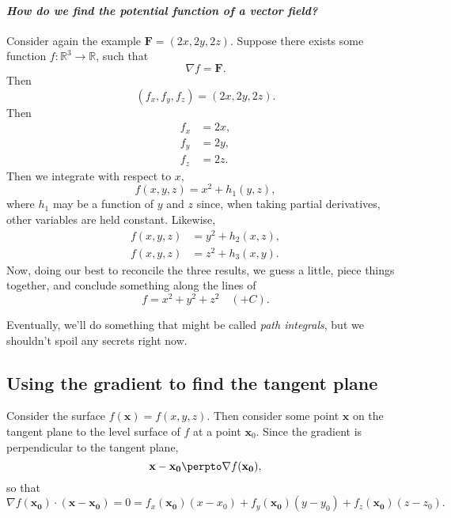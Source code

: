 \documentclass[11pt]{article}
\renewcommand{\vec}[1]{\mathbf{#1}}
\begin{document}
\paragraph{\emph{How do we find the potential function of a vector field?}}

Consider again the example \(\vec F = (2x, 2y, 2z)\). Suppose there exists some function \(f \colon \mathbb R^3 \to \mathbb R\), such that
\[
    \nabla f = \vec F.
\]
Then 
\[
    (f_x, f_y, f_z) = (2x, 2y, 2z).
\]
Then
\begin{align*}
    f_x &= 2x, \\
    f_y &= 2y, \\
    f_z &= 2z.
\end{align*}
Then we integrate with respect to \(x\),
\[
    f(x, y, z) = x^2 + h_1(y, z),
\]
where \(h_1\) may be a function of \(y\) and \(z\) since, when taking partial derivatives, other variables are held constant. Likewise,
\begin{align*}
    f(x, y, z) &= y^2 + h_2(x, z), \\
    f(x, y, z) &= z^2 + h_3(x, y).
\end{align*}
Now, doing our best to reconcile the three results, we guess a little, piece things together, and conclude something along the lines of 
\[
    f = x^2 + y^2 + z^2 \quad (+C).
\]

Eventually, we'll do something that might be called \emph{path integrals}, but we shouldn't spoil any secrets right now.

\subsection*{Using the gradient to find the tangent plane}

Consider the surface \(f(\vec x) = f(x, y, z)\). Then consider some point \(\vec x\) on the tangent plane to the level surface of \(f\) at a point \(\vec x_0\). Since the gradient is perpendicular to the tangent plane,
\[
    \vec x - \vec {x_0} \perpto \nabla f(\vec {x_0}),
\]
so that
\[
    \nabla f(\vec {x_0}) \cdot (\vec x - \vec{x_0}) = 0 = f_x(\vec {x_0}) (x-x_0) + f_y(\vec {x_0}) (y-y_0) + f_z(\vec {x_0}) (z-z_0).
\]
\end{document}
